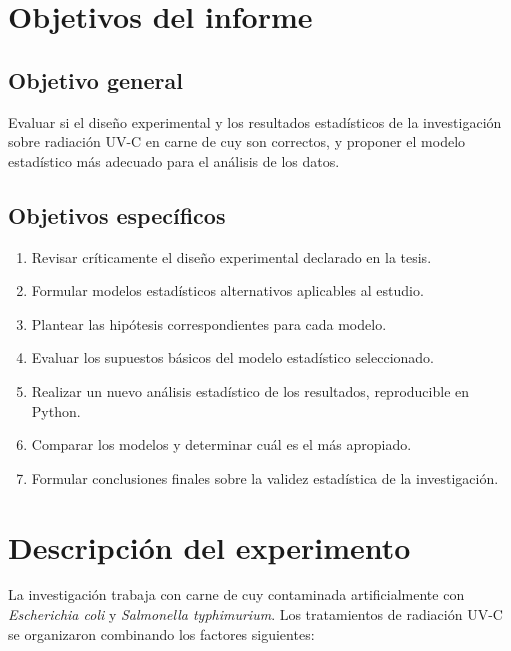 \documentclass[12pt,a4paper]{article}
\begin{document}
\section{Objetivos del informe}

\subsection{Objetivo general}

Evaluar si el diseño experimental y los resultados estadísticos de la investigación sobre radiación UV-C en carne de cuy son correctos, y proponer el modelo estadístico más adecuado para el análisis de los datos.

\subsection{Objetivos específicos}

\begin{enumerate}[label=\alph*)]
    \item Revisar críticamente el diseño experimental declarado en la tesis.
    \item Formular modelos estadísticos alternativos aplicables al estudio.
    \item Plantear las hipótesis correspondientes para cada modelo.
    \item Evaluar los supuestos básicos del modelo estadístico seleccionado.
    \item Realizar un nuevo análisis estadístico de los resultados, reproducible en Python.
    \item Comparar los modelos y determinar cuál es el más apropiado.
    \item Formular conclusiones finales sobre la validez estadística de la investigación.
\end{enumerate}

\section{Descripción del experimento}

La investigación trabaja con carne de cuy contaminada artificialmente con \textit{Escherichia coli} y \textit{Salmonella typhimurium}. Los tratamientos de radiación UV-C se organizaron combinando los factores siguientes:
\end{document}
